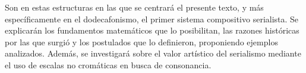 		Son en estas estructuras en las que se centrará el presente texto, y más específicamente en el dodecafonismo, el primer sistema compositivo serialista. Se explicarán los fundamentos matemáticos que lo posibilitan, las razones históricas por las que surgió y los postulados que lo definieron, proponiendo ejemplos analizados. Además, se investigará sobre el valor artístico del serialismo mediante el uso de escalas no cromáticas en busca de consonancia.
        
        \renewcommand*\contentsname{\vspace{0cm}\begin{Huge}\textbf{Índice general}\end{Huge}\vspace{-1cm}}
	\tableofcontents
	\newpage
	$\ $
	\thispagestyle{empty}
	\newpage
	$\ $
	\thispagestyle{empty}
	\newpage
